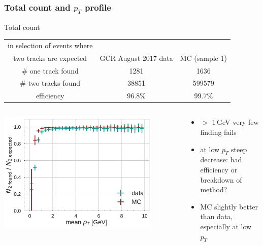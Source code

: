 \documentclass[18pt]{beamer}
\begin{document}
\begin{frame}
  \frametitle{Total count and $p_T$ profile}
  \begin{block}{Total count}
  \begin{tabular}{c|cc}
    in selection of events where\\two tracks are expected & GCR August 2017 data &  MC (sample 1)\\
    \hline
    \# one track found & 1281 & 1636 \\
    \# two tracks found &  38851 & 599579\\
    efficiency & 96.8\% & 99.7\% \\
  \end{tabular}
\end{block}
\begin{columns}
  \begin{column}{0.5\textwidth}
    \includegraphics[width=0.85\textwidth]{figures/efficiency_study/cosmicbased_findeff_over_pt.pdf}
  \end{column}
  \begin{column}{0.5\textwidth}
    \begin{itemize}
    \item $>$ 1\,GeV very few finding fails
    \item at low $p_T$ steep decrease: bad efficiency or breakdown of method?
    \item MC slightly better than data, especially at low $p_T$
    \end{itemize}
  \end{column}
\end{columns}
\end{frame}
\end{document}

